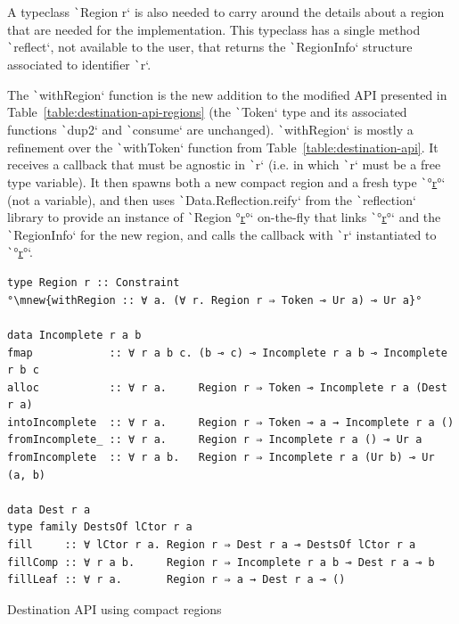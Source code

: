 \documentclass[english]{jflart}
\newcommand{\mnew}[1]{\colorbox{green!50}{#1}}
\newcommand{\muline}[1]{\uline{#1}}
\begin{document}
A typeclass \texttt`Region r` is also needed to carry around the details about a region that are needed for the implementation. This typeclass has a single method \texttt`reflect`, not available to the user, that returns the \texttt`RegionInfo` structure associated to identifier \texttt`r`.

The \texttt`withRegion` function is the new addition to the modified API presented in Table~\ref{table:destination-api-regions} (the \texttt`Token` type and its associated functions \texttt`dup2` and \texttt`consume` are unchanged). \texttt`withRegion` is mostly a refinement over the \texttt`withToken` function from Table~\ref{table:destination-api}. It receives a callback that must be agnostic in \texttt`r` (i.e. in which \texttt`r` must be a free type variable). It then spawns both a new compact region and a fresh type \texttt`°\muline{r}°` (not a variable), and then uses \texttt`Data.Reflection.reify` from the \texttt`reflection` library to provide an instance of \texttt`Region °\muline{r}°` on-the-fly that links \texttt`°\muline{r}°` and the \texttt`RegionInfo` for the new region, and calls the callback with \texttt`r` instantiated to \texttt`°\muline{r}°`.

\begin{table}[t]
\small
\begin{verbatim}
type Region r :: Constraint
°\mnew{withRegion :: ∀ a. (∀ r. Region r ⇒ Token ⊸ Ur a) ⊸ Ur a}°

data Incomplete r a b
fmap            :: ∀ r a b c. (b ⊸ c) ⊸ Incomplete r a b ⊸ Incomplete r b c
alloc           :: ∀ r a.     Region r ⇒ Token ⊸ Incomplete r a (Dest r a)
intoIncomplete  :: ∀ r a.     Region r ⇒ Token ⊸ a → Incomplete r a ()
fromIncomplete_ :: ∀ r a.     Region r ⇒ Incomplete r a () ⊸ Ur a
fromIncomplete  :: ∀ r a b.   Region r ⇒ Incomplete r a (Ur b) ⊸ Ur (a, b)

data Dest r a
type family DestsOf lCtor r a
fill     :: ∀ lCtor r a. Region r ⇒ Dest r a ⊸ DestsOf lCtor r a
fillComp :: ∀ r a b.     Region r ⇒ Incomplete r a b ⊸ Dest r a ⊸ b
fillLeaf :: ∀ r a.       Region r ⇒ a → Dest r a ⊸ ()
\end{verbatim}
\caption{Destination API using compact regions}
\label{table:destination-api-regions}
\end{table}
\end{document}

